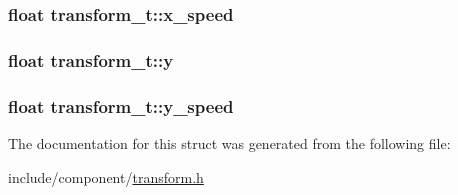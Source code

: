\subsubsection[{\texorpdfstring{x\+\_\+speed}{x\_speed}}]{\setlength{\rightskip}{0pt plus 5cm}float transform\+\_\+t\+::x\+\_\+speed}\hypertarget{structtransform__t_a3dfafe13ab0fcbf01ad5535f30c13bde}{}\label{structtransform__t_a3dfafe13ab0fcbf01ad5535f30c13bde}
\subsubsection[{\texorpdfstring{y}{y}}]{\setlength{\rightskip}{0pt plus 5cm}float transform\+\_\+t\+::y}\hypertarget{structtransform__t_ab5c2c657ca08da07220eda12f4a3fa26}{}\label{structtransform__t_ab5c2c657ca08da07220eda12f4a3fa26}
\subsubsection[{\texorpdfstring{y\+\_\+speed}{y\_speed}}]{\setlength{\rightskip}{0pt plus 5cm}float transform\+\_\+t\+::y\+\_\+speed}\hypertarget{structtransform__t_a749cd7bbef5ec055a35fb3d0e4dcda0c}{}\label{structtransform__t_a749cd7bbef5ec055a35fb3d0e4dcda0c}


The documentation for this struct was generated from the following file\+:\begin{DoxyCompactItemize}
\item 
include/component/\hyperlink{transform_8h}{transform.\+h}\end{DoxyCompactItemize}
